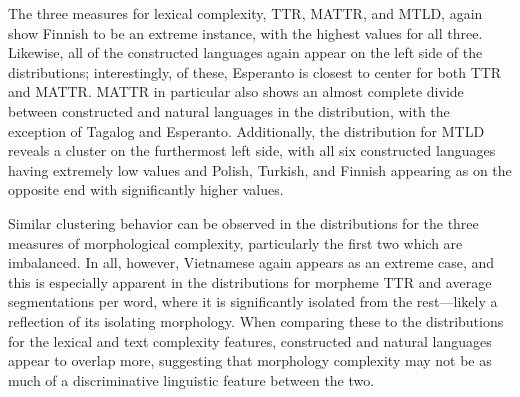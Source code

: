 \documentclass[12pt,a4paper]{article}
\numberwithin{figure}{section}
\numberwithin{table}{section}
\numberwithin{definition}{section}
\begin{document}
The three measures for lexical complexity, TTR, MATTR, and MTLD, again show Finnish to be an extreme instance, with the highest values for all three. Likewise, all of the constructed languages again appear on the left side of the distributions; interestingly, of these, Esperanto is closest to center for both TTR and MATTR. MATTR in particular also shows an almost complete divide between constructed and natural languages in the distribution, with the exception of Tagalog and Esperanto. Additionally, the distribution for MTLD reveals a cluster on the furthermost left side, with all six constructed languages having extremely low values and Polish, Turkish, and Finnish appearing as on the opposite end with significantly higher values. 

Similar clustering behavior can be observed in the distributions for the three measures of morphological complexity, particularly the first two which are imbalanced. In all, however, Vietnamese again appears as an extreme case, and this is especially apparent in the distributions for morpheme TTR and average segmentations per word, where it is significantly isolated from the rest---likely a reflection of its isolating morphology. When comparing these to the distributions for the lexical and text complexity features, constructed and natural languages appear to overlap more, suggesting that morphology complexity may not be as much of a discriminative linguistic feature between the two.
\end{document}
